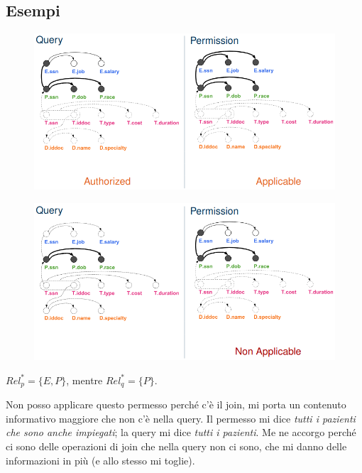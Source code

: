 \documentclass{report}
\begin{document}
\subsection{Esempi}

\begin{figure}[H]
    \centering
    \includegraphics[width=1\linewidth]{images/perm1.png}
\end{figure}

\begin{figure}[H]
    \centering
    \includegraphics[width=1\linewidth]{images/perm2.png}
\end{figure}

\noindent $Rel^*_p = \{E, P\}$, mentre $Rel^*_q = \{P\}$. 

\noindent Non posso applicare questo permesso perché c'è il join, mi 
porta un contenuto informativo maggiore che non c'è nella query. 
\noindent Il permesso mi dice \textit{tutti i pazienti che sono anche impiegati}; la query mi dice \textit{tutti i pazienti}. Me ne accorgo perché 
ci sono delle operazioni di join che nella query non ci sono, che mi danno delle informazioni in più (e allo stesso mi toglie).
\end{document}
